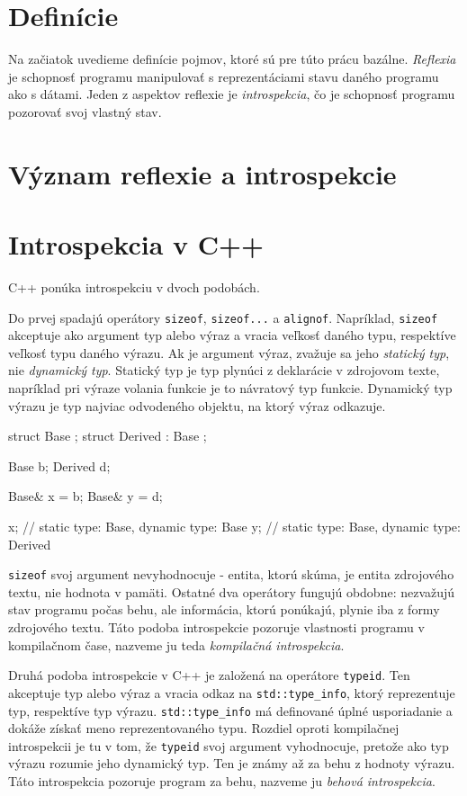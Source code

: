 \chapter{Definície}

Na začiatok uvedieme definície pojmov, ktoré sú pre túto prácu bazálne.
\emph{Reflexia} je schopnosť programu manipulovať s reprezentáciami stavu daného programu ako s dátami.
Jeden z aspektov reflexie je \emph{introspekcia}, čo je schopnosť programu pozorovať svoj vlastný stav.

\chapter{Význam reflexie a introspekcie}



\chapter{Introspekcia v C++}

C++ ponúka introspekciu v dvoch podobách.

Do prvej spadajú operátory \texttt{sizeof}, \texttt{sizeof...} a \texttt{alignof}. Napríklad, \texttt{sizeof} akceptuje ako argument typ alebo výraz a vracia veľkosť daného typu, respektíve veľkosť typu daného výrazu. Ak je argument výraz, zvažuje sa jeho \emph{statický typ}, nie \emph{dynamický typ}. Statický typ je typ plynúci z deklarácie v zdrojovom texte, napríklad pri výraze volania funkcie je to návratový typ funkcie. Dynamický typ výrazu je typ najviac odvodeného objektu, na ktorý výraz odkazuje.
\begin{code}
struct Base {};
struct Derived : Base {};

Base b;
Derived d;

Base& x = b;
Base& y = d;

x; // static type: Base, dynamic type: Base
y; // static type: Base, dynamic type: Derived
\end{code}
\texttt{sizeof} svoj argument nevyhodnocuje - entita, ktorú skúma, je entita zdrojového textu, nie hodnota v pamäti. Ostatné dva operátory fungujú obdobne: nezvažujú stav programu počas behu, ale informácia, ktorú ponúkajú, plynie iba z formy zdrojového textu. Táto podoba introspekcie pozoruje vlastnosti programu v kompilačnom čase, nazveme ju teda \emph{kompilačná introspekcia}.

Druhá podoba introspekcie v C++ je založená na operátore \texttt{typeid}. Ten akceptuje typ alebo výraz a vracia odkaz na \texttt{std::type\_info}, ktorý reprezentuje typ, respektíve typ výrazu. \texttt{std::type\_info} má definované úplné usporiadanie a dokáže získať meno reprezentovaného typu. Rozdiel oproti kompilačnej introspekcii je tu v tom, že \texttt{typeid} svoj argument vyhodnocuje, pretože ako typ výrazu rozumie jeho dynamický typ. Ten je známy až za behu z hodnoty výrazu. Táto introspekcia pozoruje program za behu, nazveme ju \emph{behová introspekcia}.

